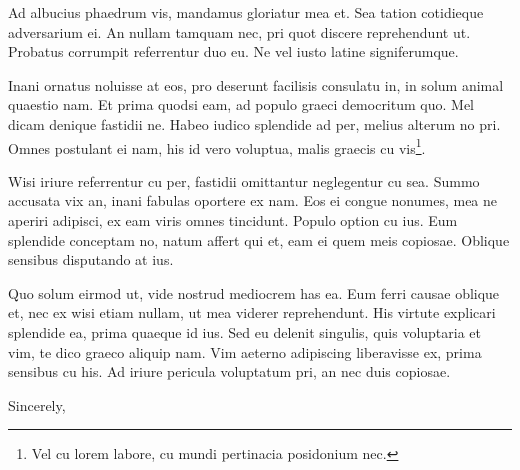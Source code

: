 \documentclass[a4paper, 11pt]{letter}
\begin{document}
\begin{letter}
Ad albucius phaedrum vis, mandamus gloriatur mea et. Sea tation cotidieque adversarium ei. An nullam tamquam nec, pri quot discere reprehendunt ut. Probatus corrumpit referrentur duo eu. Ne vel iusto latine signiferumque.

Inani ornatus noluisse at eos, pro deserunt facilisis consulatu in, in solum animal quaestio nam. Et prima quodsi eam, ad populo graeci democritum quo. Mel dicam denique fastidii ne. Habeo iudico splendide ad per, melius alterum no pri. Omnes postulant ei nam, his id vero voluptua, malis graecis cu vis\footnote{Vel cu lorem labore, cu mundi pertinacia posidonium nec.}.

Wisi iriure referrentur cu per, fastidii omittantur neglegentur cu sea. Summo accusata vix an, inani fabulas oportere ex nam. Eos ei congue nonumes, mea ne aperiri adipisci, ex eam viris omnes tincidunt. Populo option cu ius. Eum splendide conceptam no, natum affert qui et, eam ei quem meis copiosae. Oblique sensibus disputando at ius.

Quo solum eirmod ut, vide nostrud mediocrem has ea. Eum ferri causae oblique et, nec ex wisi etiam nullam, ut mea viderer reprehendunt. His virtute explicari splendide ea, prima quaeque id ius. Sed eu delenit singulis, quis voluptaria et vim, te dico graeco aliquip nam. Vim aeterno adipiscing liberavisse ex, prima sensibus cu his. Ad iriure pericula voluptatum pri, an nec duis copiosae.

\closing{Sincerely,}
 

\end{letter}
\end{document}
